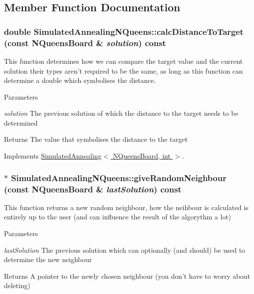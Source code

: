 \subsection{Member Function Documentation}
\hypertarget{class_simulated_annealing_n_queens_a1cd2713f3c67f9c0b4d6ce64d31690ad}{
\subsubsection[{calcDistanceToTarget}]{\setlength{\rightskip}{0pt plus 5cm}double SimulatedAnnealingNQueens::calcDistanceToTarget (const {\bf NQueensBoard} \& {\em solution}) const}}
\label{class_simulated_annealing_n_queens_a1cd2713f3c67f9c0b4d6ce64d31690ad}
This function determines how we can compare the target value and the current solution their types aren't required to be the same, as long as this function can determine a double which symbolises the distance. 
\begin{DoxyParams}{Parameters}
\item[{\em solution}]The previous solution of which the distance to the target needs to be determined \end{DoxyParams}
\begin{DoxyReturn}{Returns}
The value that symbolises the distance to the target 
\end{DoxyReturn}


Implements \hyperlink{class_simulated_annealing_ac68b8a3c38d3095893498b9a7e292346}{SimulatedAnnealing$<$ NQueensBoard, int $>$}.\hypertarget{class_simulated_annealing_n_queens_a137985c9ff6d0e88cdaf5859c29b7e19}{
\subsubsection[{giveRandomNeighbour}]{ $\ast$ SimulatedAnnealingNQueens::giveRandomNeighbour (const {\bf NQueensBoard} \& {\em lastSolution}) const}}
\label{class_simulated_annealing_n_queens_a137985c9ff6d0e88cdaf5859c29b7e19}
This function returns a new random neighbour, how the neihbour is calculated is entirely up to the user (and can influence the result of the algorythm a lot) 
\begin{DoxyParams}{Parameters}
\item[{\em lastSolution}]The previous solution which can optionally (and should) be used to determine the new neighbour \end{DoxyParams}
\begin{DoxyReturn}{Returns}
A pointer to the newly chosen neighbour (you don't have to worry about deleting) 
\end{DoxyReturn}



